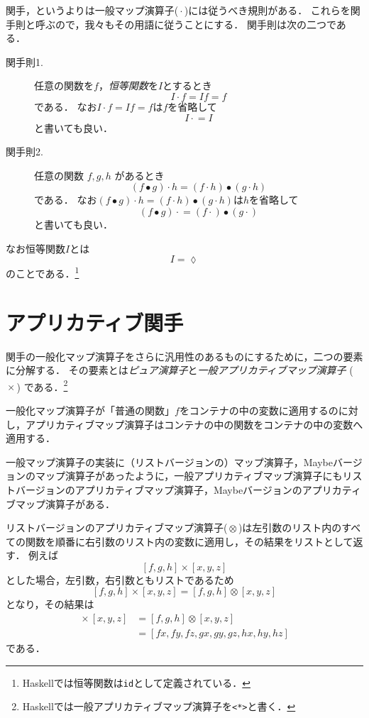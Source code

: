 \documentclass[twocolumn]{jsbook}
\newcommand{\keyword}[1]{{\emph{#1}}}
\newcommand{\code}[1]{\texttt{#1}}
\DeclareMathOperator{\hsklApplicativeMap}{\times}
\DeclareMathOperator{\hsklApplicativeListMap}{\otimes}
\DeclareMathOperator{\hsklFmap}{\cdot}
\DeclareMathOperator{\mathCompose}{\bullet}
\newcommand{\mathLambdaAnonymousParameter}{\lozenge}
\begin{document}
関手，というよりは一般マップ演算子($\hsklFmap$)には従うべき規則がある．
これらを関手則と呼ぶので，我々もその用語に従うことにする．
関手則は次の二つである．
\begin{description}
\item[関手則1.] 任意の関数を$f$，\keyword{恒等関数}を$I$とするとき
$$I\hsklFmap f=If=f$$
である．
なお$I\hsklFmap f=If=f$は$f$を省略して
$$I\hsklFmap=I$$
と書いても良い．
\item[関手則2.] 任意の関数 $f,g,h$ があるとき
$$(f\mathCompose g)\hsklFmap h=(f\hsklFmap h)\mathCompose(g\hsklFmap h)$$
である．
なお$(f\mathCompose g)\hsklFmap h=(f\hsklFmap h)\mathCompose(g\hsklFmap h)$は$h$を省略して$$(f\mathCompose g)\hsklFmap=(f\hsklFmap)\mathCompose(g\hsklFmap)$$と書いても良い．
\end{description}
なお恒等関数$I$とは
$$I=\mathLambdaAnonymousParameter$$
のことである．\footnote{Haskellでは恒等関数は\code{id}として定義されている．}





\section{アプリカティブ関手}

関手の一般化マップ演算子をさらに汎用性のあるものにするために，二つの要素に分解する．
その要素とは\keyword{ピュア演算子}と\keyword{一般アプリカティブマップ演算子} ($\hsklApplicativeMap$) である．\footnote{Haskellでは一般アプリカティブマップ演算子を\code{<*>}と書く．}

一般化マップ演算子が「普通の関数」$f$をコンテナの中の変数に適用するのに対し，アプリカティブマップ演算子はコンテナの中の関数をコンテナの中の変数へ適用する．

一般マップ演算子の実装に（リストバージョンの）マップ演算子，Maybeバージョンのマップ演算子があったように，一般アプリカティブマップ演算子にもリストバージョンのアプリカティブマップ演算子，Maybeバージョンのアプリカティブマップ演算子がある．

リストバージョンのアプリカティブマップ演算子($\hsklApplicativeListMap$)は左引数のリスト内のすべての関数を順番に右引数のリスト内の変数に適用し，その結果をリストとして返す．
例えば$$[f,g,h]\hsklApplicativeMap[x,y,z]$$とした場合，左引数，右引数ともリストであるため$$[f,g,h]\hsklApplicativeMap[x,y,z]=[f,g,h]\hsklApplicativeListMap[x,y,z]$$となり，その結果は
\begin{align*}
[f,g,h]\hsklApplicativeMap[x,y,z]&=[f,g,h]\hsklApplicativeListMap[x,y,z]\\
&=[fx,fy,fz,gx,gy,gz,hx,hy,hz]
\end{align*}
である．
\end{document}
